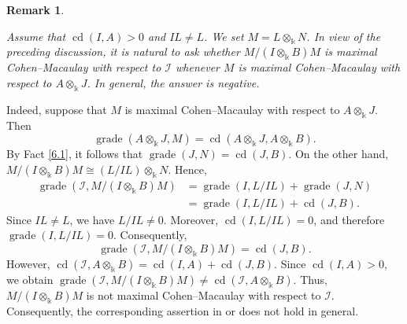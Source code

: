 \documentclass[10pt,a4paper]{amsart}
\numberwithin{equation}{theorem}
\theoremstyle{definition}
\theoremstyle{fact}
\newtheorem{remark}[theorem]{Remark}
\theoremstyle{conjecture}
\newcommand{\grade}{\operatorname{grade}}
\newcommand{\cd}{\operatorname{cd}}
\begin{document}
\begin{remark}
\label{6.11}{\em
Assume that $\cd(I,A)>0$ and $IL\neq L$. We set $M=L\otimes_{\Bbbk}N$.
In view of the preceding discussion, it is natural to ask whether
$
M/(I\otimes_{\Bbbk}B)M
$
is maximal Cohen--Macaulay with respect to $\mathcal{I}$ whenever
$M$ is maximal Cohen--Macaulay with respect to $A\otimes_{\Bbbk}J$.
In general, the answer is negative.

Indeed, suppose that $M$ is maximal
Cohen--Macaulay with respect to $A\otimes_{\Bbbk}J$. Then
\[
\grade(A\otimes_{\Bbbk}J,M)
=
\cd(A\otimes_{\Bbbk}J,A\otimes_{\Bbbk}B).
\]
By Fact \ref{6.1}, it follows that $\grade(J,N)=\cd(J,B)$.
On the other hand,
$
M/(I\otimes_{\Bbbk}B)M
\cong (L/IL)\otimes_{\Bbbk}N.
$
Hence,
\[
\begin{aligned}
\grade\left(
\mathcal{I},
M/(I\otimes_{\Bbbk}B)M
\right)&=\grade(I,L/IL)+\grade(J,N)\\
        &= \grade(I,L/IL)+\cd(J,B).
\end{aligned}
\]
Since $IL\neq L$, we have $L/IL\neq 0$. Moreover, $\cd(I,L/IL)=0$, and therefore $\grade(I,L/IL)=0$.
Consequently,
\[
\grade\left(
\mathcal{I},
M/(I\otimes_{\Bbbk}B)M
\right)
=\cd(J,B).
\]
However,  $\cd(\mathcal{I},A\otimes_{\Bbbk}B)
=\cd(I,A)+\cd(J,B).
$
Since $\cd(I,A)>0$, we obtain
$\grade\left(
\mathcal{I},
M/(I\otimes_{\Bbbk}B)M
\right)\neq
\cd(\mathcal{I},A\otimes_{\Bbbk}B)$.
Thus, $M/(I\otimes_{\Bbbk}B)M$ is not maximal
Cohen--Macaulay with respect to $\mathcal{I}$.
Consequently, the corresponding assertion in
 \cite{R5} or \cite{NR}
does not hold in general.}
\end{remark}
\end{document}
